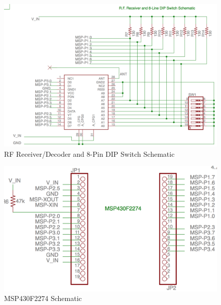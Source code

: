 \documentclass[letterpaper,10pt]{article}
\begin{document}
\begin{spacing}{1.15}
\begin{figure} [H]
	\centering
	\includegraphics[scale=0.4]{receiver-dip-schematic.png}
	\caption{RF Receiver/Decoder and 8-Pin DIP Switch Schematic\label{fig:rf-receiver-decoder-schematic}}
\end{figure}

\begin{figure} [H]
	\centering
	\includegraphics[scale=0.4]{msp-schematic.png}
	\caption{MSP430F2274 Schematic\label{fig:msp-schematic}}
\end{figure}



\end{spacing}
\end{document}
